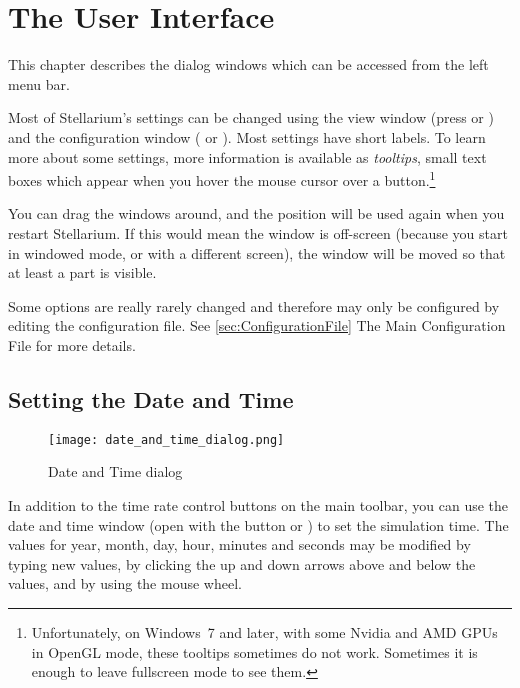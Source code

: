 

\chapter{The User Interface}
\label{ch:gui}


This chapter describes the dialog windows which can be accessed from the left menu bar.

Most of Stellarium's settings can be changed using the view window
(press  or ) and the
configuration window ( or
). Most settings have short labels. To learn more about some
settings, more information is available as \emph{tooltips}, small text
boxes which appear when you hover the mouse cursor over a
button.\footnote{Unfortunately, on Windows~7 and later, with some Nvidia
  and AMD GPUs in OpenGL mode, these tooltips sometimes do not work. 
  Sometimes it is enough to leave fullscreen mode to see them.}

You can drag the
windows around, and the position will be used again when you restart
Stellarium. If this would mean the window is off-screen (because you
start in windowed mode, or with a different screen), the window will
be moved so that at least a part is visible.

Some options are really rarely changed and therefore may only be
configured by editing the configuration file.  See
\ref{sec:ConfigurationFile} The Main Configuration File for more
details.



\section{Setting the Date and Time}
\label{sec:gui:date}

\begin{figure}[htbp]
\centering\texttt{[image: date\_and\_time\_dialog.png]}
\caption{Date and Time dialog}
\label{fig:gui:date}
\end{figure}

In addition to the time rate control buttons on the main toolbar, you
can use the date and time window (open with the  
button or ) to set the simulation time. The values
for year, month, day, hour, minutes and seconds may be modified by
typing new values, by clicking the up and down arrows above and below
the values, and by using the mouse wheel.

